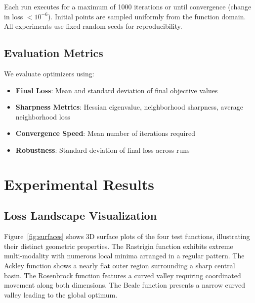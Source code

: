 \documentclass[12pt,a4paper]{article}
\begin{document}
Each run executes for a maximum of 1000 iterations or until convergence (change in loss $< 10^{-6}$). Initial points are sampled uniformly from the function domain. All experiments use fixed random seeds for reproducibility.

\subsection{Evaluation Metrics}

We evaluate optimizers using:

\begin{itemize}
    \item \textbf{Final Loss}: Mean and standard deviation of final objective values
    \item \textbf{Sharpness Metrics}: Hessian eigenvalue, neighborhood sharpness, average neighborhood loss
    \item \textbf{Convergence Speed}: Mean number of iterations required
    \item \textbf{Robustness}: Standard deviation of final loss across runs
\end{itemize}

\section{Experimental Results}
\label{sec:results}

\subsection{Loss Landscape Visualization}

Figure~\ref{fig:surfaces} shows 3D surface plots of the four test functions, illustrating their distinct geometric properties. The Rastrigin function exhibits extreme multi-modality with numerous local minima arranged in a regular pattern. The Ackley function shows a nearly flat outer region surrounding a sharp central basin. The Rosenbrock function features a curved valley requiring coordinated movement along both dimensions. The Beale function presents a narrow curved valley leading to the global optimum.
\end{document}
